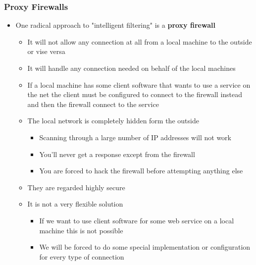 \documentclass[11pt]{article}
\begin{document}
\subsubsection{Proxy Firewalls}
\label{sec:orgf892af9}
\begin{itemize}
\item One radical approach to "intelligent filtering" is a \textbf{proxy firewall}
\begin{itemize}
\item It will not allow any connection at all from a local machine to the outside or vise versa
\item It will handle any connection needed on behalf of the local machines
\item If a local machine has some client software that wants to use a service on the net the client must be configured to connect to the firewall instead and then the firewall connect to the service
\item The local network is completely hidden form the outside
\begin{itemize}
\item Scanning through a large number of IP addresses will not work
\item You'll never get a response except from the firewall
\item You are forced to hack the firewall before attempting anything else
\end{itemize}
\item They are regarded highly secure
\item It is not a very flexible solution
\begin{itemize}
\item If we want to use client software for some web service on a local machine this is not possible
\item We will be forced to do some special implementation or configuration for every type of connection
\end{itemize}
\end{itemize}
\end{itemize}
\end{document}
